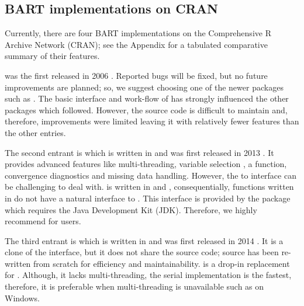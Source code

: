 \documentclass[article]{jss}
\begin{document}
\subsection{BART implementations on CRAN}

Currently, there are four BART implementations on the Comprehensive R
Archive Network (CRAN); see the Appendix for a tabulated comparative
summary of their features.

 was the first released in 2006 \citep{ChipMcCu16}.
Reported bugs will be fixed, but no future improvements are planned;
so, we suggest choosing one of the newer packages such as .
The basic interface and work-flow of  has strongly
influenced the other packages which followed.  However, the
 source code is difficult to maintain and, therefore,
improvements were limited leaving it with relatively fewer features
than the other entries.

The second entrant is  which is written in
 and was first released in 2013 \citep{KapeBlei16}.  It
provides advanced features like multi-threading, variable selection
\citep{BleiKape14}, a  function, convergence diagnostics
and missing data handling.  However, the  to
 interface can be challenging to deal with.
 is written in  and ,
consequentially, functions written in  do not have a
natural interface to .  This interface is provided by the
 \citep{Urba17} package which requires the Java Development
Kit (JDK).  Therefore, we highly recommend  for  
 users. 

The third entrant is  which is written in 
and was first released in 2014 \citep{DoriChip16}.  It is a clone of
the  interface, but it does not share the source code;
 source has been re-written from scratch for efficiency
and maintainability.   is a drop-in replacement for
.  Although, it lacks multi-threading, the 
serial implementation is the fastest, therefore, it is preferable when
multi-threading is unavailable such as on Windows.
\end{document}
